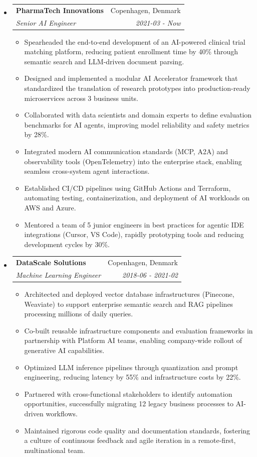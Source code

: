 \documentclass[letterpaper,11pt]{article}
\makeatletter
\newcommand{\resitem}[1]{\item #1 \vspace{-2pt}}
\newcommand{\ressubheading}[4]{
    \begin{tabular*}{6.5in}{p{4.8in}@{\extracolsep{\fill}}r}
            \textbf{#1} & #2 \\
            \textit{#3} & \textit{#4} \\
    \end{tabular*}\vspace{-8pt}}
\makeatother
\begin{document}
      \begin{itemize}
        \item \ressubheading{PharmaTech Innovations}{Copenhagen, Denmark}{Senior AI Engineer}{2021-03 - Now}
        \begin{itemize}
            \resitem{Spearheaded the end-to-end development of an AI-powered clinical trial matching platform, reducing patient enrollment time by 40\% through semantic search and LLM-driven document parsing.}
            \resitem{Designed and implemented a modular AI Accelerator framework that standardized the translation of research prototypes into production-ready microservices across 3 business units.}
            \resitem{Collaborated with data scientists and domain experts to define evaluation benchmarks for AI agents, improving model reliability and safety metrics by 28\%.}
            \resitem{Integrated modern AI communication standards (MCP, A2A) and observability tools (OpenTelemetry) into the enterprise stack, enabling seamless cross-system agent interactions.}
            \resitem{Established CI/CD pipelines using GitHub Actions and Terraform, automating testing, containerization, and deployment of AI workloads on AWS and Azure.}
            \resitem{Mentored a team of 5 junior engineers in best practices for agentic IDE integrations (Cursor, VS Code), rapidly prototyping tools and reducing development cycles by 30\%.}
        \end{itemize}
        \item \ressubheading{DataScale Solutions}{Copenhagen, Denmark}{Machine Learning Engineer}{2018-06 - 2021-02}
        \begin{itemize}
            \resitem{Architected and deployed vector database infrastructures (Pinecone, Weaviate) to support enterprise semantic search and RAG pipelines processing millions of daily queries.}
            \resitem{Co-built reusable infrastructure components and evaluation frameworks in partnership with Platform AI teams, enabling company-wide rollout of generative AI capabilities.}
            \resitem{Optimized LLM inference pipelines through quantization and prompt engineering, reducing latency by 55\% and infrastructure costs by 22\%.}
            \resitem{Partnered with cross-functional stakeholders to identify automation opportunities, successfully migrating 12 legacy business processes to AI-driven workflows.}
            \resitem{Maintained rigorous code quality and documentation standards, fostering a culture of continuous feedback and agile iteration in a remote-first, multinational team.}

\end{itemize}
\end{itemize}
\end{document}
